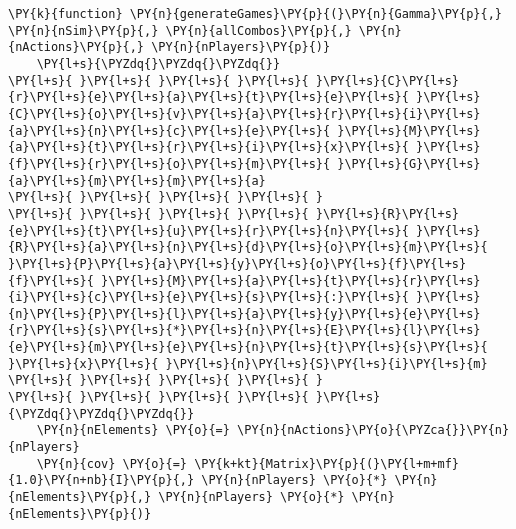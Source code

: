 \documentclass[main.tex]{subfiles}
\begin{document}
    \begin{tcolorbox}[breakable, size=fbox, boxrule=1pt, pad at break*=1mm,colback=cellbackground, colframe=cellborder]
\begin{Verbatim}[commandchars=\\\{\}]
\PY{k}{function} \PY{n}{generateGames}\PY{p}{(}\PY{n}{Gamma}\PY{p}{,} \PY{n}{nSim}\PY{p}{,} \PY{n}{allCombos}\PY{p}{,} \PY{n}{nActions}\PY{p}{,} \PY{n}{nPlayers}\PY{p}{)}
    \PY{l+s}{\PYZdq{}\PYZdq{}\PYZdq{}}
\PY{l+s}{ }\PY{l+s}{ }\PY{l+s}{ }\PY{l+s}{ }\PY{l+s}{C}\PY{l+s}{r}\PY{l+s}{e}\PY{l+s}{a}\PY{l+s}{t}\PY{l+s}{e}\PY{l+s}{ }\PY{l+s}{C}\PY{l+s}{o}\PY{l+s}{v}\PY{l+s}{a}\PY{l+s}{r}\PY{l+s}{i}\PY{l+s}{a}\PY{l+s}{n}\PY{l+s}{c}\PY{l+s}{e}\PY{l+s}{ }\PY{l+s}{M}\PY{l+s}{a}\PY{l+s}{t}\PY{l+s}{r}\PY{l+s}{i}\PY{l+s}{x}\PY{l+s}{ }\PY{l+s}{f}\PY{l+s}{r}\PY{l+s}{o}\PY{l+s}{m}\PY{l+s}{ }\PY{l+s}{G}\PY{l+s}{a}\PY{l+s}{m}\PY{l+s}{m}\PY{l+s}{a}
\PY{l+s}{ }\PY{l+s}{ }\PY{l+s}{ }\PY{l+s}{ }
\PY{l+s}{ }\PY{l+s}{ }\PY{l+s}{ }\PY{l+s}{ }\PY{l+s}{R}\PY{l+s}{e}\PY{l+s}{t}\PY{l+s}{u}\PY{l+s}{r}\PY{l+s}{n}\PY{l+s}{ }\PY{l+s}{R}\PY{l+s}{a}\PY{l+s}{n}\PY{l+s}{d}\PY{l+s}{o}\PY{l+s}{m}\PY{l+s}{ }\PY{l+s}{P}\PY{l+s}{a}\PY{l+s}{y}\PY{l+s}{o}\PY{l+s}{f}\PY{l+s}{f}\PY{l+s}{ }\PY{l+s}{M}\PY{l+s}{a}\PY{l+s}{t}\PY{l+s}{r}\PY{l+s}{i}\PY{l+s}{c}\PY{l+s}{e}\PY{l+s}{s}\PY{l+s}{:}\PY{l+s}{ }\PY{l+s}{n}\PY{l+s}{P}\PY{l+s}{l}\PY{l+s}{a}\PY{l+s}{y}\PY{l+s}{e}\PY{l+s}{r}\PY{l+s}{s}\PY{l+s}{*}\PY{l+s}{n}\PY{l+s}{E}\PY{l+s}{l}\PY{l+s}{e}\PY{l+s}{m}\PY{l+s}{e}\PY{l+s}{n}\PY{l+s}{t}\PY{l+s}{s}\PY{l+s}{ }\PY{l+s}{x}\PY{l+s}{ }\PY{l+s}{n}\PY{l+s}{S}\PY{l+s}{i}\PY{l+s}{m}
\PY{l+s}{ }\PY{l+s}{ }\PY{l+s}{ }\PY{l+s}{ }
\PY{l+s}{ }\PY{l+s}{ }\PY{l+s}{ }\PY{l+s}{ }\PY{l+s}{\PYZdq{}\PYZdq{}\PYZdq{}}
    \PY{n}{nElements} \PY{o}{=} \PY{n}{nActions}\PY{o}{\PYZca{}}\PY{n}{nPlayers}
    \PY{n}{cov} \PY{o}{=} \PY{k+kt}{Matrix}\PY{p}{(}\PY{l+m+mf}{1.0}\PY{n+nb}{I}\PY{p}{,} \PY{n}{nPlayers} \PY{o}{*} \PY{n}{nElements}\PY{p}{,} \PY{n}{nPlayers} \PY{o}{*} \PY{n}{nElements}\PY{p}{)}
    

\end{Verbatim}
\end{tcolorbox}
\end{document}
